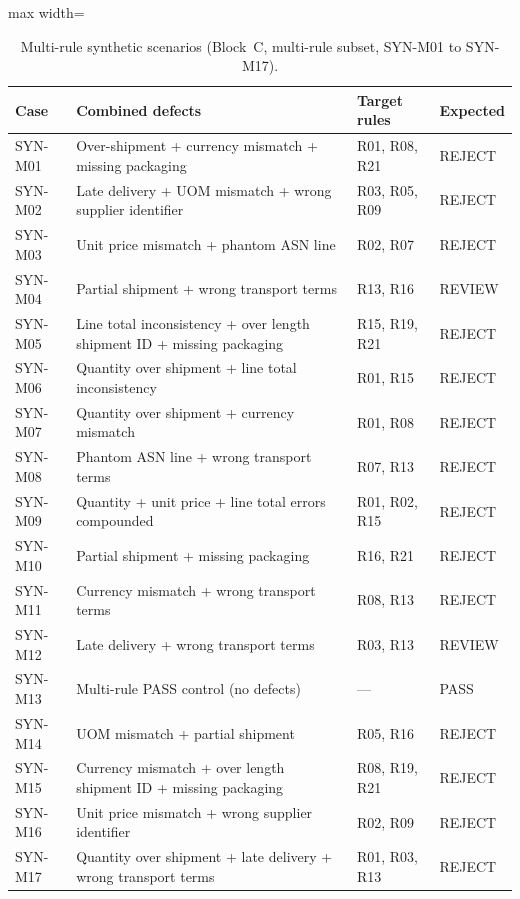 \begin{table}[htbp]
\centering
\caption{Multi-rule synthetic scenarios (Block~C, multi-rule subset, SYN-M01 to SYN-M17).}
\label{tab:app:multirule}
\footnotesize
\begin{adjustbox}{max width=\textwidth}
\begin{tabular}{@{}lp{6.5cm}ll@{}}
\toprule
\textbf{Case} & \textbf{Combined defects} & \textbf{Target rules} & \textbf{Expected} \\
\midrule
SYN-M01 & Over-shipment + currency mismatch + missing packaging                & R01, R08, R21   & REJECT \\
SYN-M02 & Late delivery + UOM mismatch + wrong supplier identifier             & R03, R05, R09   & REJECT \\
SYN-M03 & Unit price mismatch + phantom ASN line                               & R02, R07        & REJECT \\
SYN-M04 & Partial shipment + wrong transport terms                             & R13, R16        & REVIEW \\
SYN-M05 & Line total inconsistency + over length shipment ID + missing packaging & R15, R19, R21 & REJECT \\
SYN-M06 & Quantity over shipment + line total inconsistency                    & R01, R15        & REJECT \\
SYN-M07 & Quantity over shipment + currency mismatch                           & R01, R08        & REJECT \\
SYN-M08 & Phantom ASN line + wrong transport terms                             & R07, R13        & REJECT \\
SYN-M09 & Quantity + unit price + line total errors compounded                 & R01, R02, R15   & REJECT \\
SYN-M10 & Partial shipment + missing packaging                                 & R16, R21        & REJECT \\
SYN-M11 & Currency mismatch + wrong transport terms                            & R08, R13        & REJECT \\
SYN-M12 & Late delivery + wrong transport terms                                & R03, R13        & REVIEW \\
SYN-M13 & Multi-rule PASS control (no defects)                                 & ---             & PASS   \\
SYN-M14 & UOM mismatch + partial shipment                                      & R05, R16        & REJECT \\
SYN-M15 & Currency mismatch + over length shipment ID + missing packaging      & R08, R19, R21   & REJECT \\
SYN-M16 & Unit price mismatch + wrong supplier identifier                      & R02, R09        & REJECT \\
SYN-M17 & Quantity over shipment + late delivery + wrong transport terms       & R01, R03, R13   & REJECT \\
\bottomrule
\end{tabular}
\end{adjustbox}
\end{table}


